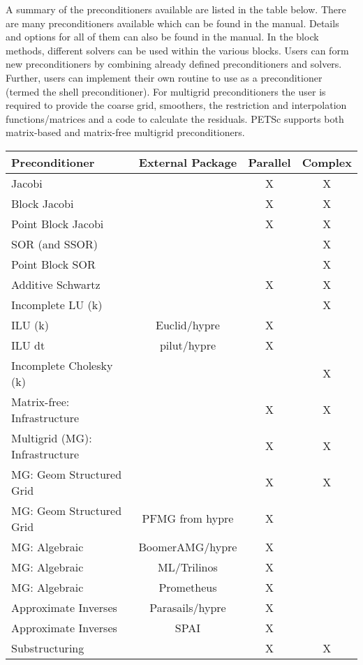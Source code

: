 \documentclass[12pt,twoside]{article}
\begin{document}
A summary of the preconditioners available are listed in the table below. There are many preconditioners available which can be found in the manual. Details and options for all of them can also be found in the manual. In the block methods, different solvers can be used within the various blocks. Users can form new preconditioners by combining already defined preconditioners and solvers. Further, users can implement their own routine to use as a preconditioner (termed the shell preconditioner). For multigrid preconditioners the user is required to provide the coarse grid, smoothers, the restriction and interpolation functions/matrices and a code to calculate the residuals. PETSc supports both matrix-based and matrix-free multigrid preconditioners. 
\\
\begin{tabular}{|l|c|c|c|}
\hline
\textbf{Preconditioner} & \textbf{External Package} & \textbf{Parallel} & \textbf{Complex} \\
\hline
Jacobi &  & X & X \\
\hline
Block Jacobi &  & X & X \\
\hline
Point Block Jacobi &  & X & X \\
\hline
SOR (and SSOR) &  &  & X \\
\hline
Point Block SOR &  &  & X \\
\hline
Additive Schwartz &  & X & X \\
\hline
Incomplete LU (k) &  &  & X \\
\hline
ILU (k) & Euclid/hypre & X &   \\
\hline
ILU dt & pilut/hypre & X &   \\
\hline 
Incomplete Cholesky (k) &  &  & X \\
\hline
Matrix-free: Infrastructure &  & X & X \\
\hline
Multigrid (MG): Infrastructure &  & X & X \\
\hline
MG: Geom Structured Grid &  & X & X \\
\hline
MG: Geom Structured Grid & PFMG from hypre & X &   \\
\hline
MG: Algebraic & BoomerAMG/hypre & X &   \\
\hline
MG: Algebraic & ML/Trilinos & X &   \\
\hline
MG: Algebraic & Prometheus & X &   \\
\hline
Approximate Inverses & Parasails/hypre & X &   \\
\hline
Approximate Inverses & SPAI & X &   \\
\hline
Substructuring &  & X & X \\
\hline
\end{tabular} \\
\\
\end{document}
